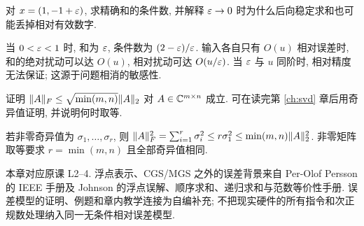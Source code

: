 \begin{exercise}
对 $x=(1,-1+\varepsilon)$, 求精确和的条件数, 并解释 $\varepsilon\to0$ 时为什么后向稳定求和也可能丢掉相对有效数字.
\end{exercise}
\begin{solution}
当 $0<\varepsilon<1$ 时, 和为 $\varepsilon$, 条件数为 $(2-\varepsilon)/\varepsilon$. 输入各自只有 $O(u)$ 相对误差时, 和的绝对扰动可以达 $O(u)$, 相对扰动可达 $O(u/\varepsilon)$. 当 $\varepsilon$ 与 $u$ 同阶时, 相对精度无法保证; 这源于问题相消的敏感性.
\end{solution}
\begin{exercise}
证明 $\lVert A\rVert_F\le\sqrt{\min(m,n)}\lVert A\rVert_2$ 对 $A\in\mathbb C^{m\times n}$ 成立. 可在读完第 \ref{ch:svd} 章后用奇异值证明, 并说明何时取等.
\end{exercise}
\begin{solution}
若非零奇异值为 $\sigma_1,\ldots,\sigma_r$, 则 $\lVert A\rVert_F^2=\sum_{i=1}^r\sigma_i^2\le r\sigma_1^2\le\min(m,n)\lVert A\rVert_2^2$. 非零矩阵取等要求 $r=\min(m,n)$ 且全部奇异值相同.
\end{solution}
\begin{remark}
本章对应原课 L2--4. 浮点表示、CGS/MGS 之外的误差背景来自 Per-Olof Persson 的 IEEE 手册及 Johnson 的浮点误解、顺序求和、递归求和与范数等价性手册. 误差模型的证明、例题和章内教学连接为自编补充; 不把现实硬件的所有指令和次正规数处理纳入同一无条件相对误差模型.
\end{remark}
